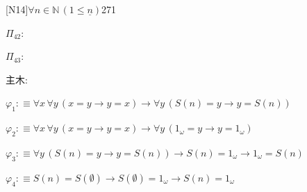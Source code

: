 \begin{fullproof}{[N14]}{$\forall n \in \mathbb{N}\,(1 \leq \underline{n})$}{271}
\begin{ptree}
\end{ptree}
\noindent$\Pi_{42}$:
\begin{ptree}
\noLine
{}
\end{ptree}
\noindent$\Pi_{43}$:
\begin{ptree}
\noLine
{}
\end{ptree}
\noindent 主木:
\begin{ptree}
\noLine
{}
\end{ptree}
\begin{abbrevlist}
\item $\varphi_{1} :\equiv \forall x\,\forall y\,(x = y \to y = x) \to \forall y\,(S(n) = y \to y = S(n))$
\item $\varphi_{2} :\equiv \forall x\,\forall y\,(x = y \to y = x) \to \forall y\,(1_{\omega} = y \to y = 1_{\omega})$
\item $\varphi_{3} :\equiv \forall y\,(S(n) = y \to y = S(n)) \to S(n) = 1_{\omega} \to 1_{\omega} = S(n)$
\item $\varphi_{4} :\equiv S(n) = S(\emptyset) \to S(\emptyset) = 1_{\omega} \to S(n) = 1_{\omega}$

\end{abbrevlist}
\end{fullproof}
